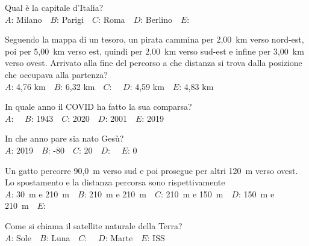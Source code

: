 \mcquestionfooter



\def\mcquestionnumber{2}


\mcquestionheader Qual è la capitale d’Italia?\\
{$A$}: Milano\ \ {$B$}: Parigi\ \ {$C$}: Roma\ \ {$D$}: Berlino\ \ {$E$}: \ \ 

\mcquestionfooter



\def\mcquestionnumber{3}


\mcquestionheader Seguendo la mappa di un tesoro, un pirata cammina per 2,00~km verso nord-est, poi per 5,00~km verso est, quindi per 2,00~km verso sud-est e infine per 3,00~km verso ovest. Arrivato alla fine del percorso a che distanza si trova dalla posizione che occupava alla partenza?\\
{$A$}: 4,76 km\ \ {$B$}: 6,32 km\ \ {$C$}: \ \ {$D$}: 4,59 km\ \ {$E$}: 4,83 km\ \ 

\mcquestionfooter



\def\mcquestionnumber{4}


\mcquestionheader In quale anno il COVID ha fatto la sua comparsa?\\
{$A$}: \ \ {$B$}: 1943\ \ {$C$}: 2020\ \ {$D$}: 2001\ \ {$E$}: 2019\ \ 

\mcquestionfooter



\def\mcquestionnumber{5}


\mcquestionheader In che anno pare sia nato Gesù?\\
{$A$}: 2019\ \ {$B$}: -80\ \ {$C$}: 20\ \ {$D$}: \ \ {$E$}: 0\ \ 

\mcquestionfooter



\def\mcquestionnumber{6}


\mcquestionheader Un gatto percorre 90,0~m verso sud e poi prosegue per altri 120~m verso ovest. Lo spostamento e la distanza percorsa sono rispettivamente\\
{$A$}: 30~m e 210~m\ \ {$B$}: 210~m e 210~m\ \ {$C$}: 210~m e 150~m\ \ {$D$}: 150~m e 210~m\ \ {$E$}: \ \ 

\mcquestionfooter



\def\mcquestionnumber{7}


\mcquestionheader Come si chiama il satellite naturale della Terra?\\
{$A$}: Sole\ \ {$B$}: Luna\ \ {$C$}: \ \ {$D$}: Marte\ \ {$E$}: ISS\ \ 

